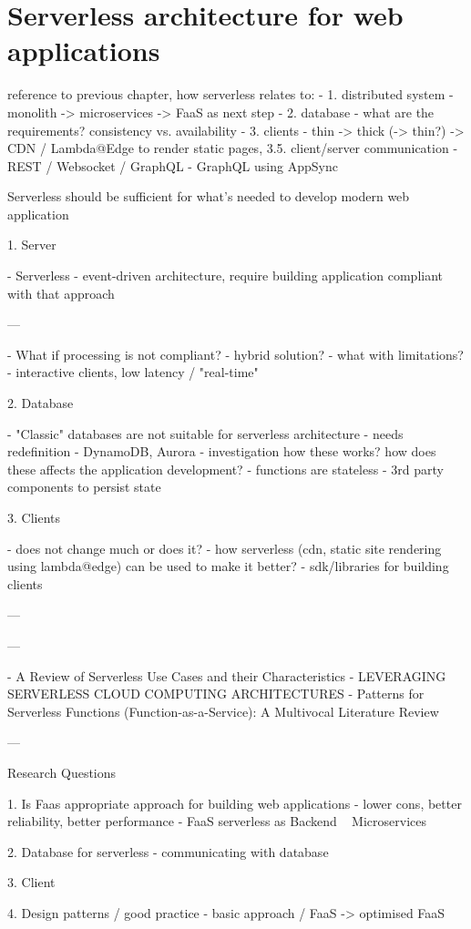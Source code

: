 \chapter{Serverless architecture for web applications}


reference to previous chapter, how serverless relates to:
- 1. distributed system - monolith -> microservices -> FaaS as next step
- 2. database - what are the requirements? consistency vs. availability
- 3. clients - thin -> thick (-> thin?) -> CDN / Lambda@Edge to render static pages, 3.5. client/server communication - REST / Websocket / GraphQL - GraphQL using AppSync

Serverless should be sufficient for what's needed to develop modern web application 

1. Server

- Serverless - event-driven architecture, require building application compliant with that approach

---

- What if processing is not compliant? - hybrid solution?
- what with limitations? - interactive clients, low latency / "real-time" 

2. Database

- "Classic" databases are not suitable for serverless architecture - needs redefinition - DynamoDB, Aurora - investigation how these works? how does these affects the application development?
- functions are stateless - 3rd party components to persist state

3. Clients 

- does not change much or does it?
- how serverless (cdn, static site rendering using lambda@edge) can be used to make it better?
- sdk/libraries for building clients

---

---

- A Review of Serverless Use Cases and their Characteristics
- LEVERAGING SERVERLESS CLOUD COMPUTING ARCHITECTURES
- Patterns for Serverless Functions (Function-as-a-Service): A Multivocal Literature Review

---

Research Questions

1. Is Faas appropriate approach for building web applications - lower cons, better reliability, better performance
- FaaS serverless as Backend ~ Microservices

2. Database for serverless - communicating with database

3. Client

4. Design patterns / good practice
- basic approach / FaaS -> optimised FaaS